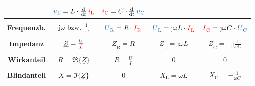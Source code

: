 \begin{frame}
\begin{table}[h]
{\begin{tabular}{ |c|c|c|c|c| }
                & $ \ecv{u_{\mathrm{L}}} = L \cdot \frac{\d}{\d t}\, \eci{i_{\mathrm{L}}} $ 
                & $ \eci{i_{\mathrm{C}}} = C \cdot \frac{\d}{\d t}\, \ecv{u_{\mathrm{C}}} $ \\[+4pt]
        \hline &&&&\\[-6pt]
        \textbf{Frequenzb.}
                & $ \mathrm{j}\omega $ bzw. $ \frac{1}{\mathrm{j}\omega} $
                & $ \ecv{\underline{U}_{\mathrm R}} = R                   \cdot \eci{\underline{I}_{\mathrm R}} $ 
                & $ \ecv{\underline{U}_{\mathrm L}} = \mathrm{j}\omega L  \cdot \eci{\underline{I}_{\mathrm L}} $
                & $ \eci{\underline{I}_{\mathrm C}} = \mathrm{j}\omega C  \cdot \ecv{\underline{U}_{\mathrm C}} $ \\[+4pt]
        \hline &&&&\\[-6pt]
        \textbf{Impedanz}
                & $ \underline{Z} = \frac{\ecv{\underline{U}}}{\eci{\underline{I}}} $
                & $ \underline{Z}_{\mathrm R} = R $ 
                & $ \underline{Z}_{\mathrm L} = \mathrm{j}\omega L $
                & $ \underline{Z}_{\mathrm C} = -\mathrm{j}\frac{1}{\omega C} $ \\[+4pt]
        \hline &&&&\\[-6pt]
        \textbf{Wirkanteil}
                & $ R = \Re\{\underline{Z}\} $
                & $ R = \frac{U}{I} $
                & $ 0 $
                & $ 0 $ \\[+4pt]
                \hline &&&&\\[-6pt]
        \textbf{Blindanteil}
                & $ X = \Im\{\underline{Z}\} $
                & $ 0 $
                & $ X_{\mathrm L} = \omega L $
                & $ X_{\mathrm C} = -\frac{1}{\omega C}$ \\[+4pt]
        \hline
    \end{tabular}
    } %
    \end{table}
    
\end{frame}


